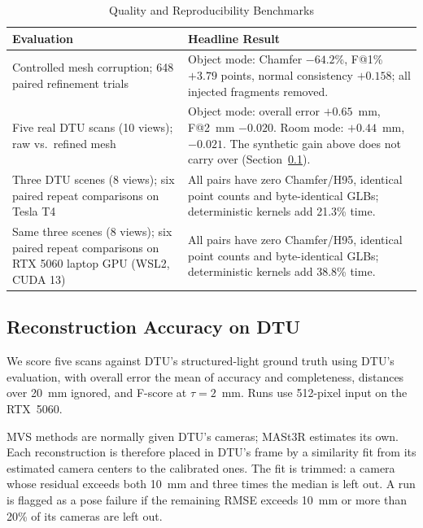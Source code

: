 \documentclass[conference]{IEEEtran}
\begin{document}
\begin{table}[tbp]
\caption{Quality and Reproducibility Benchmarks}
\begin{center}
\footnotesize
\begin{tabular}{|>{\raggedright\arraybackslash}p{2.5cm}|>{\raggedright\arraybackslash}p{5.1cm}|}
\hline
\textbf{Evaluation} & \textbf{Headline Result} \\
\hline
Controlled mesh corruption; 648 paired refinement trials & Object mode: Chamfer $-64.2$\%, F@1\% $+3.79$ points, normal consistency $+0.158$; all injected fragments removed. \\
\hline
Five real DTU scans (10 views); raw vs.\ refined mesh & Object mode: overall error $+0.65$~mm, F@2~mm $-0.020$. Room mode: $+0.44$~mm, $-0.021$. The synthetic gain above does not carry over (Section~\ref{sec:dtu}). \\
\hline
Three DTU scenes (8 views); six paired repeat comparisons on Tesla T4 & All pairs have zero Chamfer/H95, identical point counts and byte-identical GLBs; deterministic kernels add 21.3\% time. \\
\hline
Same three scenes (8 views); six paired repeat comparisons on RTX 5060 laptop GPU (WSL2, CUDA 13) & All pairs have zero Chamfer/H95, identical point counts and byte-identical GLBs; deterministic kernels add 38.8\% time. \\
\hline
\end{tabular}
\label{tab:quality-repro}
\end{center}
\end{table}

\subsection{Reconstruction Accuracy on DTU}
\label{sec:dtu}

We score five scans against DTU's structured-light ground truth \cite{b19} using
DTU's evaluation, with overall error the mean of accuracy and completeness, distances
over 20~mm ignored, and F-score at $\tau = 2$~mm. Runs use 512-pixel input on the
RTX~5060.

MVS methods are normally given DTU's cameras; MASt3R estimates its own. Each
reconstruction is therefore placed in DTU's frame by a similarity fit from its
estimated camera centers to the calibrated ones. The fit is trimmed: a camera
whose residual exceeds both 10~mm and three times the median is left out. A run
is flagged as a pose failure if the remaining RMSE exceeds 10~mm or more than 20\%
of its cameras are left out.
\end{document}
